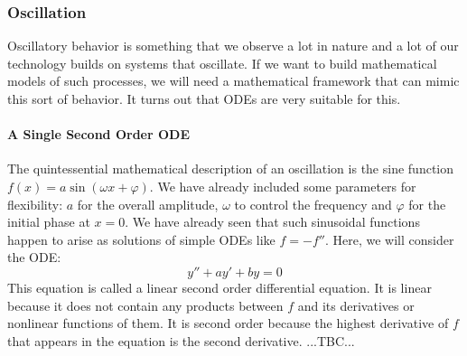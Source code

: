 \subsubsection{Oscillation}
Oscillatory behavior is something that we observe a lot in nature and a lot of our technology builds on systems that oscillate. If we want to build mathematical models of such processes, we will need a mathematical framework that can mimic this sort of behavior. It turns out that ODEs are very suitable for this.

\paragraph{A Single Second Order ODE}
The quintessential mathematical description of an oscillation is the sine function $f(x) = a \sin(\omega x + \varphi)$. We have already included some parameters for flexibility: $a$ for the overall amplitude, $\omega$ to control the frequency and $\varphi$ for the initial phase at $x=0$. We have already seen that such sinusoidal functions happen to arise as solutions of simple ODEs like $f = -f''$. Here, we will consider the ODE:
\begin{equation}
 y'' + a y' + b y = 0
\end{equation}
This equation is called a linear second order differential equation. It is linear because it does not contain any products between $f$ and its derivatives or nonlinear functions of them. It is second order because the highest derivative of $f$ that appears in the equation is the second derivative. ...TBC...







